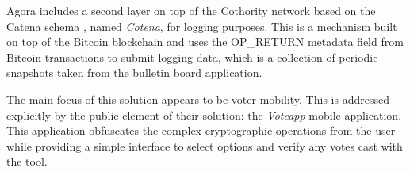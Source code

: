 \documentclass[../access.tex]{subfiles}
\begin{document}
\par
Agora includes a second layer on top of the Cothority network based on the Catena schema \cite{Tomescu2017}, named \textit{Cotena}, for logging purposes. This is a mechanism built on top of the Bitcoin blockchain and uses the OP\_RETURN metadata field from Bitcoin transactions to submit logging data, which is a collection of periodic snapshots taken from the bulletin board application.
\par
The main focus of this solution appears to be voter mobility. This is addressed explicitly by the public element of their solution: the \textit{Voteapp} mobile application. This application obfuscates the complex cryptographic operations from the user while providing a simple interface to select options and verify any votes cast with the tool.
\end{document}
